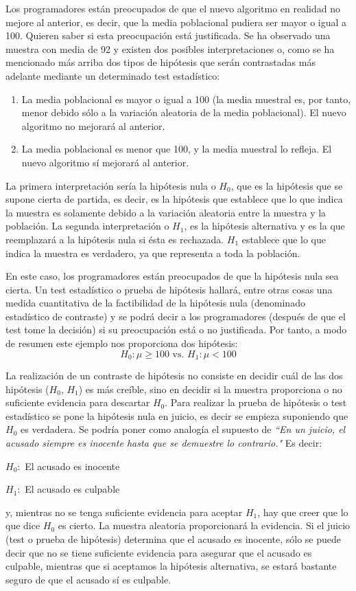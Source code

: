 Los programadores están preocupados de que el nuevo algoritmo en realidad no mejore al anterior, es decir, que
la media poblacional pudiera ser mayor o igual a 100. Quieren saber si esta preocupación está justificada. Se ha
observado una muestra con media de 92 y existen dos posibles interpretaciones o, como se ha mencionado más arriba
dos tipos de hipótesis que serán contrastadas más adelante mediante un determinado test estadístico:
\begin{enumerate}
\item La media poblacional es mayor o igual a 100 (la media muestral es, por tanto, menor debido sólo a la
variación aleatoria de la media poblacional). El nuevo algoritmo no mejorará al anterior.
\item La media poblacional es menor que 100, y la media muestral lo refleja. El nuevo algoritmo sí mejorará
al anterior.
\end{enumerate}
La primera interpretación sería la hipótesis nula o $H_0$, que es la hipótesis que se supone cierta de partida, es
decir, es la hipótesis que establece que lo que indica la muestra es solamente debido a la variación aleatoria entre
la muestra y la población. La segunda interpretación o $H_1$, es la hipótesis alternativa y es la que reemplazará a
la hipótesis nula si ésta es rechazada. $H_1$ establece que lo que indica la muestra es verdadero, ya que representa
a toda la población.

En este caso, los programadores están preocupados de que la hipótesis nula sea cierta. Un test estadístico o prueba
de hipótesis hallará, entre otras cosas  una medida cuantitativa de la factibilidad de la hipótesis nula (denominado estadístico de contraste) y se podrá decir a los programadores (después de que el test tome la decisión) si su
preocupación está o no justificada. Por tanto, a modo de resumen este ejemplo nos proporciona dos hipótesis:
$$H_0: \mu \geq 100 \mbox{ vs. } H_1: \mu < 100$$

La realización de un contraste de hipótesis no consiste en decidir cuál de las dos hipótesis ($H_0$, $H_1$) es más
creíble, sino en decidir si la muestra proporciona o no suficiente evidencia para descartar $H_0$. Para realizar la
prueba de hipótesis o test estadístico se pone la hipótesis nula en juicio, es decir se empieza suponiendo que $H_0$
es verdadera. Se podría poner como analogía el supuesto de \textit{``En un juicio, el acusado siempre es inocente
hasta que se demuestre lo contrario."} Es decir:
\begin{center}
$H_0:$ El acusado es inocente

$H_1:$ El acusado es culpable
\end{center}
y, mientras no se tenga suficiente evidencia para aceptar $H_1$, hay que creer que lo que dice $H_0$ es cierto. La
muestra aleatoria proporcionará la evidencia. Si el juicio (test o prueba de hipótesis) determina que el acusado
es inocente, sólo se puede decir que no se tiene suficiente evidencia para asegurar que el acusado es culpable,
mientras que si aceptamos la hipótesis alternativa, se estará bastante seguro de que el acusado sí es culpable.


